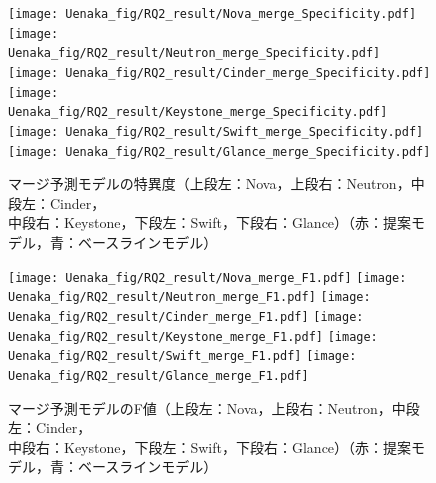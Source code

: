 \documentclass[submit]{ipsj}
\begin{document}
\begin{figure}[H]
\begin{minipage}{\textwidth}
\vspace{0.08\textheight}
\begin{center}
    \texttt{[image: Uenaka\_fig/RQ2\_result/Nova\_merge\_Specificity.pdf]}
    \texttt{[image: Uenaka\_fig/RQ2\_result/Neutron\_merge\_Specificity.pdf]}
    \texttt{[image: Uenaka\_fig/RQ2\_result/Cinder\_merge\_Specificity.pdf]}
    \texttt{[image: Uenaka\_fig/RQ2\_result/Keystone\_merge\_Specificity.pdf]}
    \texttt{[image: Uenaka\_fig/RQ2\_result/Swift\_merge\_Specificity.pdf]}
    \texttt{[image: Uenaka\_fig/RQ2\_result/Glance\_merge\_Specificity.pdf]}
    \caption{マージ予測モデルの特異度（上段左：Nova，上段右：Neutron，中段左：Cinder，\\ 中段右：Keystone，下段左：Swift，下段右：Glance）（赤：提案モデル，青：ベースラインモデル）}
    \label{fig:merge_spec}
\end{center}
\vspace{0.08\textheight}
\end{minipage}
\end{figure}

\begin{figure}[H]
\begin{center}
    \texttt{[image: Uenaka\_fig/RQ2\_result/Nova\_merge\_F1.pdf]}
    \texttt{[image: Uenaka\_fig/RQ2\_result/Neutron\_merge\_F1.pdf]}
    \texttt{[image: Uenaka\_fig/RQ2\_result/Cinder\_merge\_F1.pdf]}
    \texttt{[image: Uenaka\_fig/RQ2\_result/Keystone\_merge\_F1.pdf]}
    \texttt{[image: Uenaka\_fig/RQ2\_result/Swift\_merge\_F1.pdf]}
    \texttt{[image: Uenaka\_fig/RQ2\_result/Glance\_merge\_F1.pdf]}
    \caption{マージ予測モデルのF値（上段左：Nova，上段右：Neutron，中段左：Cinder，\\ 中段右：Keystone，下段左：Swift，下段右：Glance）（赤：提案モデル，青：ベースラインモデル）}
    \label{fig:merge_f}
\end{center}
\end{figure}
\end{document}
